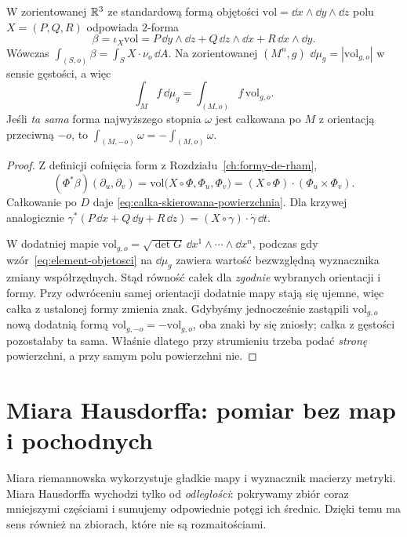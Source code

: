 \begin{stwierdzenie}
\label{prop:calka-skierowana-forma}
W zorientowanej $\mathbb{R}^3$ ze standardową
formą objętości $\mathrm{vol}=\dd x\wedge\dd y
\wedge\dd z$ polu $X=(P,Q,R)$ odpowiada $2$-forma
\[
 \beta=\iota_X\mathrm{vol}
 =P\,\dd y\wedge\dd z+
  Q\,\dd z\wedge\dd x+
  R\,\dd x\wedge\dd y.
\]
Wówczas $\int_{(S,o)}\beta
=\int_S X\cdot\nu_o\,\dd A$.
Na zorientowanej $(M^n,g)$
$\dd\mu_g=|\mathrm{vol}_{g,o}|$ w sensie gęstości,
a więc
\[
 \int_M f\,\dd\mu_g
 =\int_{(M,o)}f\,\mathrm{vol}_{g,o}.
\]
Jeśli \emph{ta sama} forma najwyższego stopnia
$\omega$ jest całkowana po $M$ z orientacją
przeciwną $-o$, to
$\int_{(M,-o)}\omega=-\int_{(M,o)}\omega$.
\end{stwierdzenie}
\begin{proof}
Z definicji cofnięcia form z
Rozdziału~\ref{ch:formy-de-rham},
\[
 (\Phi^*\beta)(\partial_u,\partial_v)
 =\mathrm{vol}\bigl(X\circ\Phi,\Phi_u,\Phi_v\bigr)
 =(X\circ\Phi)\cdot(\Phi_u\times\Phi_v).
\]
Całkowanie po $D$ daje
\eqref{eq:calka-skierowana-powierzchnia}.
Dla krzywej analogicznie
$\gamma^*(P\,\dd x+Q\,\dd y+R\,\dd z)
=(X\circ\gamma)\cdot\dot\gamma\,\dd t$.

W dodatniej mapie
$\mathrm{vol}_{g,o}=\sqrt{\det G}\,
\dd x^1\wedge\cdots\wedge\dd x^n$,
podczas gdy wzór~\eqref{eq:element-objetosci}
na $\dd\mu_g$ zawiera wartość bezwzględną
wyznacznika zmiany współrzędnych. Stąd
równość całek dla \emph{zgodnie} wybranych
orientacji i formy. Przy odwróceniu samej
orientacji dodatnie mapy stają się ujemne,
więc całka z ustalonej formy zmienia znak.
Gdybyśmy jednocześnie zastąpili
$\mathrm{vol}_{g,o}$ nową dodatnią formą
$\mathrm{vol}_{g,-o}=-\mathrm{vol}_{g,o}$,
oba znaki by się zniosły; całka z gęstości
pozostałaby ta sama. Właśnie dlatego
przy strumieniu trzeba podać \emph{stronę}
powierzchni, a przy samym polu powierzchni nie.
\end{proof}

\section{Miara Hausdorffa: pomiar bez map i pochodnych}
\label{sec:miara-hausdorffa}

Miara riemannowska wykorzystuje gładkie mapy
i wyznacznik macierzy metryki. Miara Hausdorffa
wychodzi tylko od \emph{odległości}: pokrywamy zbiór
coraz mniejszymi częściami i sumujemy odpowiednie
potęgi ich średnic. Dzięki temu ma sens również
na zbiorach, które nie są rozmaitościami.

